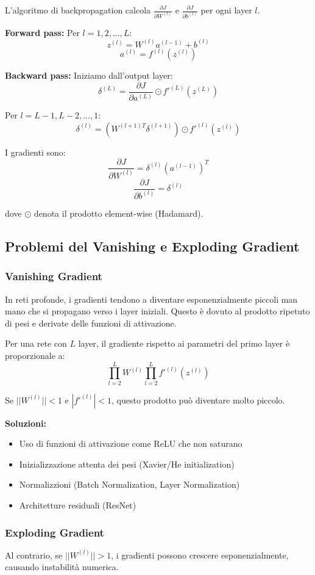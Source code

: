 \documentclass[12pt,a4paper,twoside]{report}
\begin{document}
L'algoritmo di backpropagation calcola $\frac{\partial J}{\partial W^{(l)}}$ e $\frac{\partial J}{\partial b^{(l)}}$ per ogni layer $l$.

\textbf{Forward pass:}
Per $l = 1, 2, ..., L$:
$$z^{(l)} = W^{(l)} a^{(l-1)} + b^{(l)}$$
$$a^{(l)} = f^{(l)}(z^{(l)})$$

\textbf{Backward pass:}
Iniziamo dall'output layer:
$$\delta^{(L)} = \frac{\partial J}{\partial a^{(L)}} \odot f'^{(L)}(z^{(L)})$$

Per $l = L-1, L-2, ..., 1$:
$$\delta^{(l)} = (W^{(l+1)T} \delta^{(l+1)}) \odot f'^{(l)}(z^{(l)})$$

I gradienti sono:
$$\frac{\partial J}{\partial W^{(l)}} = \delta^{(l)} (a^{(l-1)})^T$$
$$\frac{\partial J}{\partial b^{(l)}} = \delta^{(l)}$$

dove $\odot$ denota il prodotto element-wise (Hadamard).

\subsection{Problemi del Vanishing e Exploding Gradient}

\subsubsection{Vanishing Gradient}
In reti profonde, i gradienti tendono a diventare esponenzialmente piccoli man mano che si propagano verso i layer iniziali. Questo è dovuto al prodotto ripetuto di pesi e derivate delle funzioni di attivazione.

Per una rete con $L$ layer, il gradiente rispetto ai parametri del primo layer è proporzionale a:
$$\prod_{l=2}^{L} W^{(l)} \prod_{l=2}^{L} f'^{(l)}(z^{(l)})$$

Se $||W^{(l)}|| < 1$ e $|f'^{(l)}| < 1$, questo prodotto può diventare molto piccolo.

\textbf{Soluzioni:}
\begin{itemize}
    \item Uso di funzioni di attivazione come ReLU che non saturano
    \item Inizializzazione attenta dei pesi (Xavier/He initialization)
    \item Normalizzioni (Batch Normalization, Layer Normalization)
    \item Architetture residuali (ResNet)
\end{itemize}

\subsubsection{Exploding Gradient}
Al contrario, se $||W^{(l)}|| > 1$, i gradienti possono crescere esponenzialmente, causando instabilità numerica.
\end{document}

